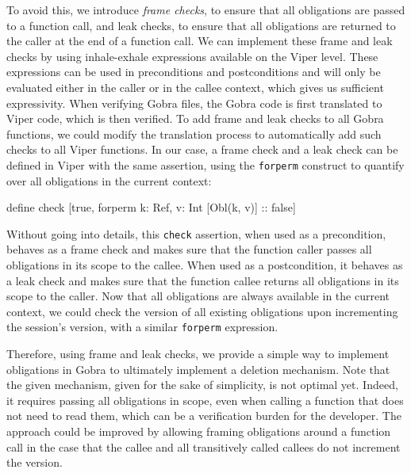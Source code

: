 To avoid this, we introduce \emph{frame checks}, to ensure that all obligations are passed to a function call, and leak checks, to ensure that all obligations are returned to the caller at the end of a function call.
We can implement these frame and leak checks by using inhale-exhale expressions available on the Viper level.
These expressions can be used in preconditions and postconditions and will only be evaluated either in the caller or in the callee context, which gives us sufficient expressivity.
When verifying Gobra files, the Gobra code is first translated to Viper code, which is then verified.
To add frame and leak checks to all Gobra functions, we could modify the translation process to automatically add such checks to all Viper functions.
In our case, a frame check and a leak check can be defined in Viper with the same assertion, using the \texttt{forperm} construct to quantify over all obligations in the current context:
\begin{gobra}
define check [true, forperm k: Ref, v: Int [Obl(k, v)] :: false]
\end{gobra}
Without going into details, this \texttt{check} assertion, when used as a precondition, behaves as a frame check and makes sure that the function caller passes all obligations in its scope to the callee. When used as a postcondition, it behaves as a leak check and makes sure that the function callee returns all obligations in its scope to the caller.
Now that all obligations are always available in the current context, we could check the version of all existing obligations upon incrementing the session's version, with a similar \texttt{forperm} expression.

Therefore, using frame and leak checks, we provide a simple way to implement obligations in Gobra to ultimately implement a deletion mechanism.
Note that the given mechanism, given for the sake of simplicity, is not optimal yet. Indeed, it requires passing all obligations in scope, even when calling a function that does not need to read them, which can be a verification burden for the developer.
The approach could be improved by allowing framing obligations around a function call in the case that the callee and all transitively called callees do not increment the version.
